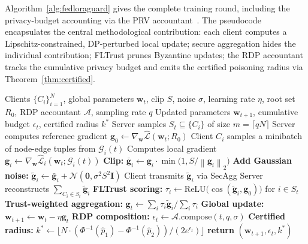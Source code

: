 \documentclass[12pt,a4paper]{article}
\theoremstyle{definition}
\theoremstyle{remark}
\newcommand{\modelname}{FedLoRAGuard}
\newcommand{\Lcal}{\mathcal{L}}
\newcommand{\Ncal}{\mathcal{N}}
\newcommand{\Gcal}{\mathcal{G}}
\newcommand{\Acal}{\mathcal{A}}
\newcommand{\norm}[1]{\left\|#1\right\|}
\begin{document}
Algorithm~\ref{alg:fedloraguard} gives the complete training round, including the privacy-budget accounting via the PRV accountant~\cite{gopi2021numerical}. The pseudocode encapsulates the central methodological contribution: each client computes a Lipschitz-constrained, DP-perturbed local update; secure aggregation hides the individual contribution; FLTrust prunes Byzantine updates; the RDP accountant tracks the cumulative privacy budget and emits the certified poisoning radius via Theorem~\ref{thm:certified}.

\begin{algorithm}[!t]
\small
\caption{\modelname{} Training Round}
\label{alg:fedloraguard}
\begin{algorithmic}[1]
\REQUIRE Clients $\{C_i\}_{i=1}^N$, global parameters $\mathbf{w}_t$, clip $S$, noise $\sigma$, learning rate $\eta$, root set $R_0$, RDP accountant $\Acal$, sampling rate $q$
\ENSURE Updated parameters $\mathbf{w}_{t+1}$, cumulative budget $\epsilon_t$, certified radius $k^*$
\STATE Server samples $S_t \subseteq \{C_i\}$ of size $m = \lceil q N \rceil$
\STATE Server computes reference gradient $\mathbf{g}_0 \gets \nabla_{\mathbf{w}} \hat{\Lcal}(\mathbf{w}_t; R_0)$ \quad {}
    \STATE Client $C_i$ samples a minibatch of node-edge tuples from $\Gcal_i(t)$
    \STATE Computes local gradient $\mathbf{g}_i \gets \nabla_{\mathbf{w}} \hat{\Lcal}_i(\mathbf{w}_t; \Gcal_i(t))$
    \STATE \textbf{Clip:} $\bar{\mathbf{g}}_i \gets \mathbf{g}_i \cdot \min\bigl(1, S/\norm{\mathbf{g}_i}_2\bigr)$
    \STATE \textbf{Add Gaussian noise:} $\tilde{\mathbf{g}}_i \gets \bar{\mathbf{g}}_i + \Ncal(\mathbf{0}, \sigma^2 S^2 \mathbf{I})$
    \STATE Client transmits $\tilde{\mathbf{g}}_i$ via SecAgg
\ENDFOR
\STATE Server reconstructs $\sum_{C_i \in S_t} \tilde{\mathbf{g}}_i$ \quad {}
\STATE \textbf{FLTrust scoring:} $\tau_i \gets \mathrm{ReLU}\bigl(\cos(\tilde{\mathbf{g}}_i, \mathbf{g}_0)\bigr)$ for $i \in S_t$
\STATE \textbf{Trust-weighted aggregation:} $\mathbf{g}_t \gets \sum_i \tau_i \tilde{\mathbf{g}}_i / \sum_i \tau_i$
\STATE \textbf{Global update:} $\mathbf{w}_{t+1} \gets \mathbf{w}_t - \eta \mathbf{g}_t$
\STATE \textbf{RDP composition:} $\epsilon_t \gets \Acal.\mathrm{compose}(t, q, \sigma)$
\STATE \textbf{Certified radius:} $k^* \gets \lfloor N \cdot (\Phi^{-1}(\hat{p}_1) - \Phi^{-1}(\hat{p}_2)) / (2 e^{\epsilon_t}) \rfloor$ \quad {}
    \STATE \textbf{return} $(\mathbf{w}_{t+1}, \epsilon_t, k^*)$
\ENDIF
\end{algorithmic}
\end{algorithm}
\end{document}
